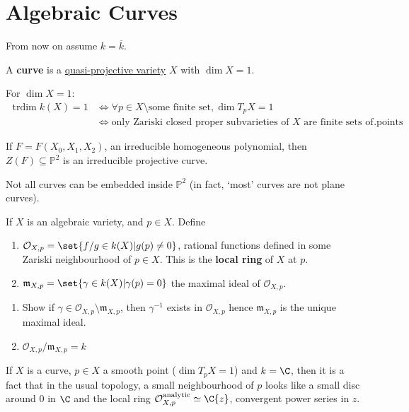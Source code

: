 \documentclass{article}
\newcommand{\proj}{\mathbb{P}}
\DeclareMathOperator{\trdim}{trdim}
\begin{document}
\leavevmode
\color{black}
\section{Algebraic Curves}
From now on assume $k = \overline{k}$.
\begin{defi}
    A \textbf{curve} is a \hyperlink{def:quasiProjVar}{quasi-projective variety} $X$ with $\dim X = 1$.
\end{defi}
For $\dim X = 1$:
\begin{align*}
    \trdim k(X) = 1 &\iff \forall p \in X \setminus \text{some finite set}, \dim T_p X = 1 \\
                    &\iff \text{only Zariski closed proper subvarieties of $X$ are finite sets of points}.
\end{align*}
\begin{eg}
    If $F = F(X_0, X_1, X_2)$, an irreducible homogeneous polynomial, then $Z(F) \subseteq \proj^2$ is an irreducible projective curve.
\end{eg}
\begin{warning}
    Not all curves can be embedded inside $\proj^2$ (in fact, `most' curves are not plane curves).
\end{warning}
\begin{defi}
    If $X$ is an algebraic variety, and $p \in X$. Define
    \begin{enumerate}[label=(\roman*)]
        \item $\mathcal{O}_{X, p} = \set{f / g \in k(X) | g(p) \neq 0}$, rational functions defined in some Zariski neighbourhood of $p \in X$. This is the \textbf{local ring} of $X$ at $p$.
        \item $\mathfrak{m}_{X, p} = \set{\gamma \in k(X) | \gamma(p) = 0}$ the maximal ideal of $\mathcal{O}_{X, p}$.
    \end{enumerate}
\end{defi}
\begin{ex}\leavevmode
    \begin{enumerate}[label=(\roman*)]
        \item Show if $\gamma \in \mathcal{O}_{X, p} \setminus \mathfrak{m}_{X, p}$, then $\gamma^{-1}$ exists in $\mathcal{O}_{X, p}$ hence $\mathfrak{m}_{X, p}$ is the unique maximal ideal.
        \item $\mathcal{O}_{X, p} / \mathfrak{m}_{X, p} = k$
    \end{enumerate}
\end{ex}
If $X$ is a curve, $p \in X$ a smooth point ($\dim T_p X = 1$) and $k = \C$, then it is a fact that in the usual topology, a small neighbourhood of $p$ looks like a small disc around $0$ in $\C$ and the local ring $\mathcal{O}_{X, p}^\text{analytic} \simeq \C \{z\}$, convergent power series in $z$.
\end{document}
